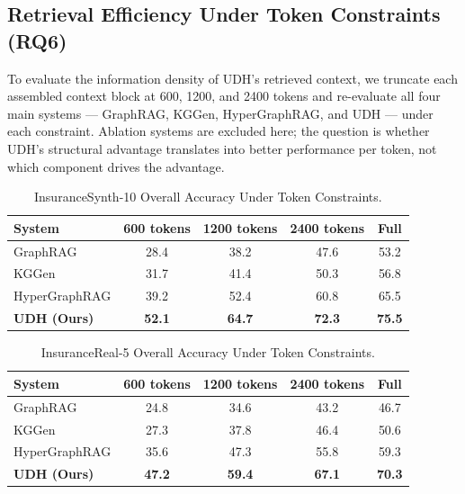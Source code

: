 \documentclass[runningheads]{llncs}
\begin{document}
\subsection{Retrieval Efficiency Under Token Constraints (RQ6)}

To evaluate the information density of UDH's retrieved context, we truncate each assembled context block at 600, 1200, and 2400 tokens and re-evaluate all four main systems --- GraphRAG, KGGen, HyperGraphRAG, and UDH --- under each constraint. Ablation systems are excluded here; the question is whether UDH's structural advantage translates into better performance per token, not which component drives the advantage.

\begin{table}[h]
\centering
\caption{InsuranceSynth-10 Overall Accuracy Under Token Constraints.}
\label{tab:token_synth}
\begin{tabular}{lcccc}
\hline
\textbf{System} & \textbf{600 tokens} & \textbf{1200 tokens} & \textbf{2400 tokens} & \textbf{Full} \\
\hline
GraphRAG         & 28.4 & 38.2 & 47.6 & 53.2 \\
KGGen            & 31.7 & 41.4 & 50.3 & 56.8 \\
HyperGraphRAG    & 39.2 & 52.4 & 60.8 & 65.5 \\
\textbf{UDH (Ours)} & \textbf{52.1} & \textbf{64.7} & \textbf{72.3} & \textbf{75.5} \\
\hline
\end{tabular}
\end{table}

\begin{table}[h]
\centering
\caption{InsuranceReal-5 Overall Accuracy Under Token Constraints.}
\label{tab:token_real}
\begin{tabular}{lcccc}
\hline
\textbf{System} & \textbf{600 tokens} & \textbf{1200 tokens} & \textbf{2400 tokens} & \textbf{Full} \\
\hline
GraphRAG         & 24.8 & 34.6 & 43.2 & 46.7 \\
KGGen            & 27.3 & 37.8 & 46.4 & 50.6 \\
HyperGraphRAG    & 35.6 & 47.3 & 55.8 & 59.3 \\
\textbf{UDH (Ours)} & \textbf{47.2} & \textbf{59.4} & \textbf{67.1} & \textbf{70.3} \\
\hline
\end{tabular}
\end{table}
\end{document}
